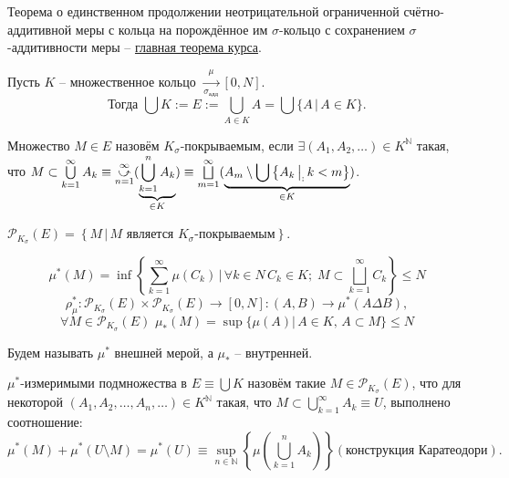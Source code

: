 \documentclass[a4paper, 12pt]{article}
\begin{document}
    

\begin{remark}
    Теорема о единственном продолжении неотрицательной ограниченной счётно-аддитивной меры с кольца на порождённое им $\sigma$-кольцо с сохранением $\sigma$-аддитивности меры -- \underline{главная теорема курса}.
\end{remark}

\begin{designation}
Пусть $K$ -- множественное кольцо $\xrightarrow[\sigma_{\text{адд}}]{\mu} [0, N]$. 
$$ \text{Тогда } \bigcup K := E := \bigcup \limits_{A \in K} A = \bigcup \{A\, |\, A \in K\}.$$
\end{designation}

\begin{definition}
    Множество $M \in E$ назовём $K_{\sigma}$-покрываемым, если $\exists (A_1, A_2, \dots) \in K^{\mathbb{N}}$ такая, 
    что $M \subset \bigcup \limits_{k = 1}^{\infty} A_k \equiv \cuparr{n = 1}{\infty} ( \underbrace{\bigcup \limits_{k = 1}^{n} A_k}_{\in K} ) \equiv \bigsqcup \limits_{m = 1}^{\infty} ( \underbrace{A_m \setminus  \bigcup \left\{ A_k \, \big|_: \, k < m \right\}}_{\in K} ) $.
\end{definition}

\begin{designation}
    $\mathcal{P}_{K_{\sigma}}(E) = \left\{M \,\big|\, M \text{ является } K_{\sigma}\text{-покрываемым}\right\}$.
\end{designation}

$$\mu^*(M) = \inf \left\{\sum \limits_{k = 1}^{\infty} \mu(C_k) \,\big|\, \forall k \in N\, C_k \in K;\; M \subset \bigsqcup \limits_{k = 1}^{\infty} C_k \right\} \leqslant N$$
$$\rho^*_{\mu}: \mathcal{P}_{K_{\sigma}}(E) \times \mathcal{P}_{K_{\sigma}}(E) \rightarrow [0, N]: (A, B) \rightarrow \mu^*(A \Delta B),$$ 
$$\forall M \in \mathcal{P}_{K_{\sigma}}(E) \,\, \mu_*(M) = \sup \{ \mu(A) |\, A \in K, \, A \subset M  \} \leqslant N$$


Будем называть $\mu^*$ внешней мерой, а $\mu_*$ -- внутренней.

\begin{definition}
    $\mu^*$-измеримыми подмножества в $E \equiv \bigcup K$ назовём такие $M \in \mathcal{P}_{K_{\sigma}}(E)$, что для некоторой $(A_1, A_2, \dots, A_n, \dots) \in K^{\mathbb{N}}$ такая, что $M \subset \bigcup \limits_{k = 1}^{\infty} A_k \equiv U$, выполнено соотношение:
    $$ \mu^* (M) + \mu^*(U \setminus M) = \mu^*(U) \equiv \sup \limits_{n \in \mathbb{N}}\left\{ \mu \left( \bigcup \limits_{k = 1}^{n} A_k \right)\right\} (\text{конструкция Каратеодори}).$$
\end{definition}
\end{document}
